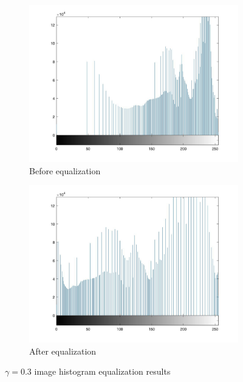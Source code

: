 \documentclass[conference]{IEEEtran}
\begin{document}
\begin{figure}[h!]
\begin{subfigure}[b]{0.4\linewidth}
\includegraphics[width=\linewidth]{images/img18.jpg}
\caption{Before equalization}
\end{subfigure}
\begin{subfigure}[b]{0.4\linewidth}
\includegraphics[width=\linewidth]{images/img19.jpg}
\caption{After equalization}
\end{subfigure}
\caption{\(\gamma = 0.3\) image histogram equalization results}
\label{fig:b}
\end{figure}
\end{document}
